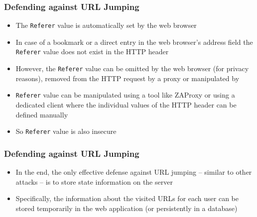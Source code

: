 \begin{frame}
    \frametitle{Defending against URL Jumping}
    \begin{itemize}
        \item The \texttt{Referer} value is automatically set by the web browser
        \item In case of a bookmark or a direct entry in the web browser's address field the \texttt{Referer} value does not exist in the HTTP header
        \item However, the \texttt{Referer} value can be omitted by the web browser (for privacy reasons), removed from the HTTP request by a proxy or manipulated by \attacker
        \item \texttt{Referer} value can be manipulated using a tool like ZAProxy or using a dedicated client where the individual values of the HTTP header can be defined manually
        \item So \texttt{Referer} value is also insecure
    \end{itemize}
\end{frame}

\begin{frame}
    \frametitle{Defending against URL Jumping}
    \begin{itemize}
        \item In the end, the only effective defense against URL jumping -- similar to other attacks -- is to store state information on the server
        \item Specifically, the information about the visited URLs for each user can be stored temporarily in the web application (or persistently in a database)
    \end{itemize}
\end{frame}